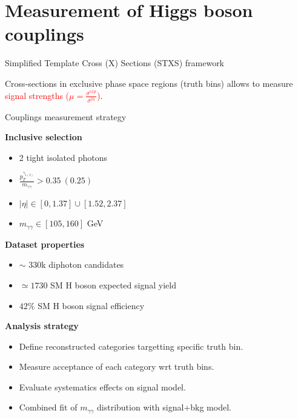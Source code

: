 \section{Measurement of Higgs boson couplings}
\frame{\tableofcontents[currentsection]}

\begin{frame}{Simplified Template Cross (X) Sections (STXS) framework}
  \centering
      
      Cross-sections in exclusive phase space regions (truth bins) allows to measure \textcolor{red}{signal strengths ($\mu=\frac{\sigma^{exp}}{\sigma^{th}}$)}.
  
\end{frame}
\begin{frame}{Couplings measurement strategy}

  \begin{minipage}{0.49\linewidth}
  {\bf Inclusive selection }
  \begin{itemize}
  \item 2 tight isolated photons
  \item $\frac{p_T^{\gamma_{1(2)}}}{m_{\gamma\gamma}} > 0.35~ (0.25)$
  \item $|\eta|\in [0, 1.37]  \cup [1.52, 2.37]$
  \item $m_{\gamma\gamma} \in [105, 160]$ GeV
  \end{itemize}
  \end{minipage}
  \hfill
  \begin{minipage}{0.49\linewidth}
    {\bf Dataset properties}  

    \begin{itemize}
    \item $\sim$ 330k diphoton candidates
    \item $\simeq 1730$ SM H boson expected signal yield
    \item $42\%$ SM H boson signal efficiency
    \end{itemize}
  \end{minipage}
  \vfill
  {\bf Analysis strategy } 
  \begin{itemize}
  \item Define reconstructed categories targetting specific truth bin.
  \item Measure acceptance of each category wrt truth bins.
  \item Evaluate systematics effects on signal model.
  \item Combined fit of $m_{\gamma\gamma}$ distribution with signal+bkg model.
  \end{itemize}

\end{frame}


